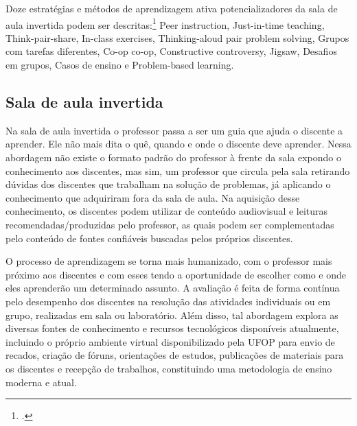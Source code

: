 \documentclass[
	12pt,				%
	openright,			%
	oneside,			%
	a4paper,			%
	english,			%
	brazil				%
	]{abntex2}
\begin{document}
Doze estratégias e métodos de aprendizagem ativa potencializadores da sala de aula invertida podem ser descritas:\footcite{elmoresauer} Peer instruction, Just-in-time teaching, Think-pair-share, In-class exercises, Thinking-aloud pair problem solving, Grupos com tarefas diferentes, Co-op co-op, Constructive controversy, Jigsaw, Desafios em grupos, Casos de ensino e Problem-based learning.

\subsection*{Sala de aula invertida}
%
Na sala de aula invertida o professor passa a ser um guia que ajuda o discente a aprender. Ele não mais dita o quê, quando e onde o discente deve aprender. Nessa abordagem não existe o formato padrão do professor à frente da sala expondo o conhecimento aos discentes, mas sim, um professor que circula pela sala retirando dúvidas dos discentes que trabalham na solução de problemas, já aplicando o conhecimento que adquiriram fora da sala de aula. Na aquisição desse conhecimento, os discentes podem utilizar de conteúdo audiovisual e leituras recomendadas/produzidas pelo professor, as quais podem ser complementadas pelo conteúdo de fontes confiáveis buscadas pelos próprios discentes.

O processo de aprendizagem se torna mais humanizado, com o professor mais próximo aos discentes e com esses tendo a oportunidade de escolher como e onde eles aprenderão um determinado assunto. A avaliação é feita de forma contínua pelo desempenho dos discentes na resolução das atividades individuais ou em grupo, realizadas em sala ou laboratório. Além disso, tal abordagem explora as diversas fontes de conhecimento e recursos tecnológicos disponíveis atualmente, incluindo o próprio ambiente virtual disponibilizado pela UFOP para envio de recados, criação de fóruns, orientações de estudos, publicações de materiais para os discentes e recepção de trabalhos, constituindo uma metodologia de ensino moderna e atual.
\end{document}
